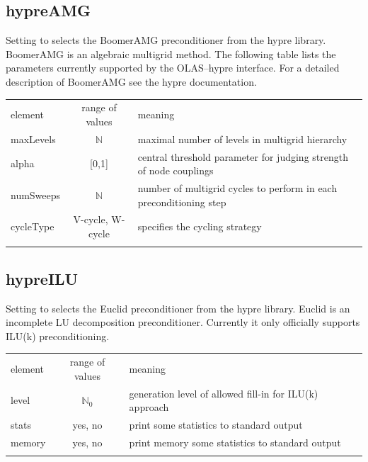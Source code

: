 \subsection{hypreAMG}
%
%
Setting  to  selects the BoomerAMG preconditioner
from the hypre library. BoomerAMG is an algebraic multigrid method. The
following table lists the parameters currently supported by the OLAS--hypre
interface. For a detailed description of BoomerAMG see the hypre documentation.
\begin{center}
\begin{tabular}{lcp{}}
\hline\noalign{\smallskip}
element & range of values & meaning \\
\noalign{\smallskip}\hline\noalign{\smallskip}
maxLevels & $\mathbb{N}$     & maximal number of levels in multigrid
                               hierarchy\\
alpha     & [0,1]            & central threshold parameter for judging strength
                               of node couplings\\
numSweeps & $\mathbb{N}$     & number of multigrid cycles to perform in each
                               preconditioning step\\
cycleType & V-cycle, W-cycle & specifies the cycling strategy\\
\noalign{\smallskip}\hline
\end{tabular}
\end{center}
%
%
\subsection{hypreILU}
Setting  to  selects the Euclid preconditioner
from the hypre library. Euclid is an incomplete LU decomposition
preconditioner. Currently it only officially supports ILU(k) preconditioning.
\begin{center}
\begin{tabular}{lcp{}}
\hline\noalign{\smallskip}
element & range of values & meaning \\
\noalign{\smallskip}\hline\noalign{\smallskip}
level  & $\mathbb{N}_0$ & generation level of allowed fill-in for ILU(k)
                          approach\\
stats  & yes, no        & print some statistics to standard output\\
memory & yes, no        & print memory some statistics to standard output\\
\noalign{\smallskip}\hline
\end{tabular}
\end{center}
%
%

